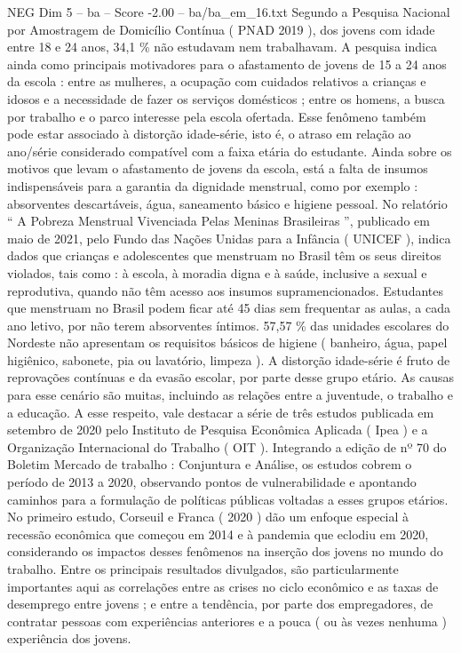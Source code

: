 \begin{textsample}{NEG Dim 5 – ba – Score -2.00 – ba/ba\_em\_16.txt}
Segundo a Pesquisa Nacional por Amostragem de Domicílio Contínua ( PNAD 2019 ), dos jovens com idade entre 18 e 24 anos, 34,1 \% não estudavam nem trabalhavam.
A pesquisa indica ainda como principais motivadores para o afastamento de jovens de 15 a 24 anos da escola : entre as mulheres, a ocupação com cuidados relativos a crianças e idosos e a necessidade de fazer os serviços domésticos ; entre os homens, a busca por trabalho e o parco interesse pela escola ofertada.
Esse fenômeno também pode estar associado à distorção idade-série, isto é, o atraso em relação ao ano/série considerado compatível com a faixa etária do estudante.
Ainda sobre os motivos que levam o afastamento de jovens da escola, está a falta de insumos indispensáveis para a garantia da dignidade menstrual, como por exemplo : absorventes descartáveis, água, saneamento básico e higiene pessoal.
No relatório “ A Pobreza Menstrual Vivenciada Pelas Meninas Brasileiras ”, publicado em maio de 2021, pelo Fundo das Nações Unidas para a Infância ( UNICEF ), indica dados que crianças e adolescentes que menstruam no Brasil têm os seus direitos violados, tais como : à escola, à moradia digna e à saúde, inclusive a sexual e reprodutiva, quando não têm acesso aos insumos supramencionados.
Estudantes que menstruam no Brasil podem ficar até 45 dias sem frequentar as aulas, a cada ano letivo, por não terem absorventes íntimos. 57,57 \% das unidades escolares do Nordeste não apresentam os requisitos básicos de higiene ( banheiro, água, papel higiênico, sabonete, pia ou lavatório, limpeza ).
A distorção idade-série é fruto de reprovações contínuas e da evasão escolar, por parte desse grupo etário.
As causas para esse cenário são muitas, incluindo as relações entre a juventude, o trabalho e a educação.
A esse respeito, vale destacar a série de três estudos publicada em setembro de 2020 pelo Instituto de Pesquisa Econômica Aplicada ( Ipea ) e a Organização Internacional do Trabalho ( OIT ).
Integrando a edição de nº 70 do Boletim Mercado de trabalho : Conjuntura e Análise, os estudos cobrem o período de 2013 a 2020, observando pontos de vulnerabilidade e apontando caminhos para a formulação de políticas públicas voltadas a esses grupos etários.
No primeiro estudo, Corseuil e Franca ( 2020 ) dão um enfoque especial à recessão econômica que começou em 2014 e à pandemia que eclodiu em 2020, considerando os impactos desses fenômenos na inserção dos jovens no mundo do trabalho.
Entre os principais resultados divulgados, são particularmente importantes aqui as correlações entre as crises no ciclo econômico e as taxas de desemprego entre jovens ; e entre a tendência, por parte dos empregadores, de contratar pessoas com experiências anteriores e a pouca ( ou às vezes nenhuma ) experiência dos jovens.

\end{textsample}
